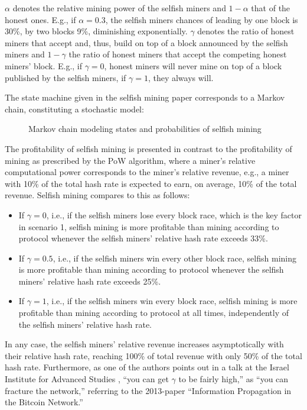 $\alpha$ denotes the relative mining power of the selfish miners and $1 - \alpha$ that of the honest ones.
E.g., if $\alpha = 0.3$, the selfish miners chances of  leading by one block is 30\%, by two blocks 9\%, diminishing exponentially.
$\gamma$ denotes the ratio of honest miners that accept and, thus, build on top of a block announced by the selfish miners and $1 - \gamma$ the ratio of honest miners that accept the competing honest miners' block.
E.g., if $\gamma = 0$, honest miners will never mine on top of a block published by the selfish miners, if $\gamma = 1$, they always will.

The state machine given in the selfish mining paper corresponds to a Markov chain, constituting a stochastic model: \autocite[8]{eyal2014}
\\
\begin{figure}[H]
	\centering
	
	\caption*{Markov chain modeling states and probabilities of selfish mining}
\end{figure}

The profitability of selfish mining is presented in contrast to the profitability of mining as prescribed by the PoW algorithm, where a miner's relative computational power corresponds to the miner's relative revenue, e.g., a miner with 10\% of the total hash rate is expected to earn, on average, 10\% of the total revenue.
Selfish mining compares to this as follows:

\begin{itemize}
	\item
		If $\gamma = 0$, i.e., if the selfish miners lose every block race, which is the key factor in scenario 1, selfish mining is more profitable than mining according to protocol whenever the selfish miners' relative hash rate exceeds 33\%.
	\item
		If $\gamma = 0.5$, i.e., if the selfish miners win every other block race, selfish mining is more profitable than mining according to protocol whenever the selfish miners' relative hash rate exceeds 25\%.
	\item
		If $\gamma = 1$, i.e., if the selfish miners win every block race, selfish mining is more profitable than mining according to protocol at all times, independently of the selfish miners' relative hash rate.
\end{itemize}

In any case, the selfish miners' relative revenue increases asymptotically with their relative hash rate, reaching 100\% of total revenue with only 50\% of the total hash rate.
Furthermore, as one of the authors points out in a talk at the Israel Institute for Advanced Studies \autocite{youtube2018alternativestotonakamotoconsensus}, ``you can get $\gamma$ to be fairly high,'' as ``you can fracture the network,'' referring to the 2013-paper ``Information Propagation in the Bitcoin Network.'' \autocite{decker2013}

